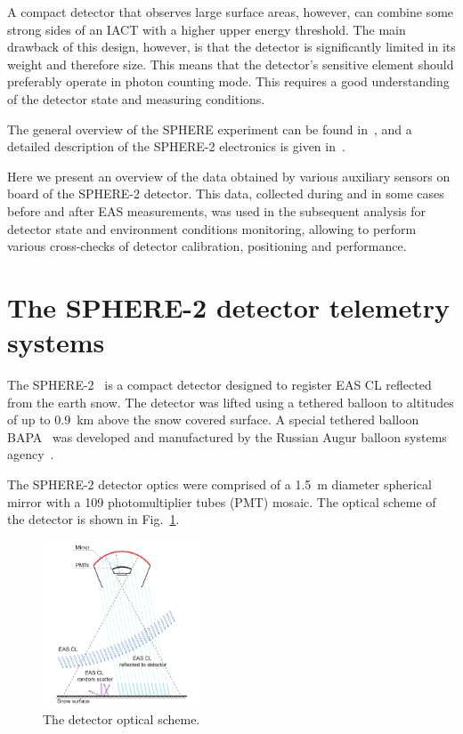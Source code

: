 \documentclass[preprint,5p,times]{elsarticle}
\begin{document}
A compact detector that observes large surface areas, however, can combine some strong sides of an IACT with a higher upper energy threshold. The main drawback of this design, however, is that the detector is significantly limited in its weight and therefore size. This means that the detector's sensitive element should preferably operate in photon counting mode. This requires a good understanding of the detector state and measuring conditions.

The general overview of the SPHERE experiment can be found in~\cite{Ant15a}, and a detailed description of the SPHERE-2 electronics is given in~\cite{Ant20}.


Here we present an overview of the data obtained by various auxiliary sensors on board of the SPHERE-2 detector. This data, collected during and in some cases before and after EAS measurements, was used in the subsequent analysis for detector state and environment conditions monitoring, allowing to perform various cross-checks of detector calibration, positioning and performance.


\section{The SPHERE-2 detector telemetry systems}
\label{sect:detector}
The \mbox{SPHERE-2}~\cite{Ant20} is a compact detector designed to register EAS CL reflected from the earth snow. The detector was lifted using a tethered balloon to altitudes of up to 0.9~km above the snow covered surface. A special tethered balloon BAPA~\cite{Ant20} was developed and manufactured by the Russian Augur balloon systems agency~\cite{Augur}.

The \mbox{SPHERE-2} detector optics were comprised of a 1.5~m diameter spherical mirror with a 109 photomultiplier tubes (PMT) mosaic. The optical scheme of the detector is shown in Fig.~\ref{fig:optics}.

\begin{figure}[bt]
\centering
    \includegraphics[width=0.42\textwidth]{optics}
    \caption{The detector optical scheme.}
\label{fig:optics}
\end{figure}
\end{document}
